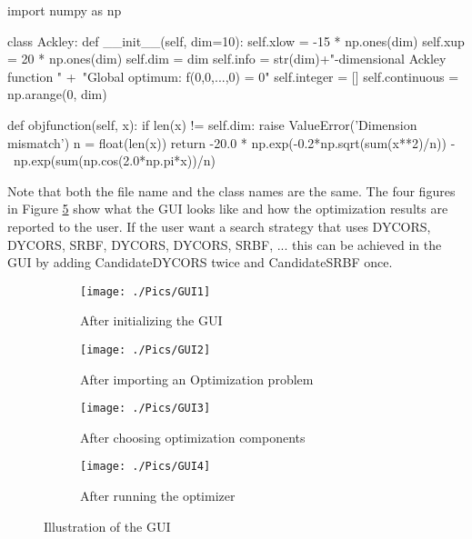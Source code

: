 \documentclass[]{article}
\begin{document}
\begin{python}
import numpy as np

class Ackley:
    def __init__(self, dim=10):
        self.xlow = -15 * np.ones(dim)
        self.xup = 20 * np.ones(dim)
        self.dim = dim
        self.info = str(dim)+"-dimensional Ackley function \n" +\
                             "Global optimum: f(0,0,...,0) = 0"
        self.integer = []
        self.continuous = np.arange(0, dim)

    def objfunction(self, x):
        if len(x) != self.dim:
            raise ValueError('Dimension mismatch')
        n = float(len(x))
        return -20.0 * np.exp(-0.2*np.sqrt(sum(x**2)/n)) - \
        		      np.exp(sum(np.cos(2.0*np.pi*x))/n)
\end{python}
Note that both the file name and the class names are the same.
\FloatBarrier
The four figures in Figure \ref{fig:gui} show what the GUI looks like and how the optimization 
results are reported to the user. If the user want a search strategy that uses DYCORS, 
DYCORS, SRBF, DYCORS, DYCORS, SRBF, ... this can be achieved in the GUI by 
adding CandidateDYCORS twice and CandidateSRBF once.
\begin{figure}
        \centering
        \begin{subfigure}{0.49\textwidth}\centering%
                    \texttt{[image: ./Pics/GUI1]}
                \caption{After initializing the GUI}
  \label{fig:First_figure}
       \end{subfigure}
    \hfill
        \begin{subfigure}{0.49\textwidth}\centering
                    \texttt{[image: ./Pics/GUI2]}
                \caption{After importing an Optimization problem}
  \label{fig:Second_figure}
       \end{subfigure}%
    \hfill
        \begin{subfigure}{0.49\textwidth}\centering
                    \texttt{[image: ./Pics/GUI3]}
                \caption{After choosing optimization components}
  \label{fig:Third_figure}
       \end{subfigure}%
    \hfill
        \begin{subfigure}{0.49\textwidth}\centering
                    \texttt{[image: ./Pics/GUI4]}
                \caption{After running the optimizer}
  \label{fig:First_figure}
       \end{subfigure}%
       \caption{Illustration of the GUI}
 \label{fig:gui}
 \end{figure}
 
\end{document}
